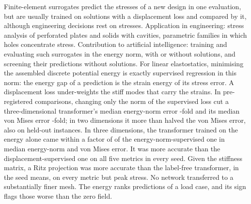 Finite-element surrogates predict the stresses of a new design in one evaluation, but are
usually trained on solutions with a displacement loss and compared by it, although
engineering decisions rest on stresses. Application in engineering: stress analysis of
perforated plates and solids with cavities, parametric families in which holes concentrate
stress. Contribution to artificial intelligence: training and evaluating such surrogates in
the energy norm, with or without solutions, and screening their predictions without
solutions. For linear elastostatics, minimising the assembled discrete potential energy is
exactly supervised regression in this norm: the energy gap of a prediction is the strain
energy of its stress error. A displacement loss under-weights the stiff modes that carry the
strains. In pre-registered comparisons, changing only the norm of the
supervised loss cut a three-dimensional transformer's median energy-norm error
\numNlThreeNormE{}-fold and its median von Mises error \numNlThreeNormVm{}-fold; in two
dimensions it more than halved the von Mises error, also on held-out instances. In three
dimensions, the transformer trained on the energy alone came within a factor of
\numNlThreeLabelWithin{} of the energy-norm-supervised one in median energy-norm and von
Mises error. It was more accurate than the displacement-supervised one on all five metrics
in every seed. Given the stiffness matrix, a Ritz projection was more accurate than the
label-free transformer, in the seed means, on every metric but peak stress. No network
transferred to a substantially finer mesh. The energy ranks predictions of a load case, and
its sign flags those worse than the zero field.
